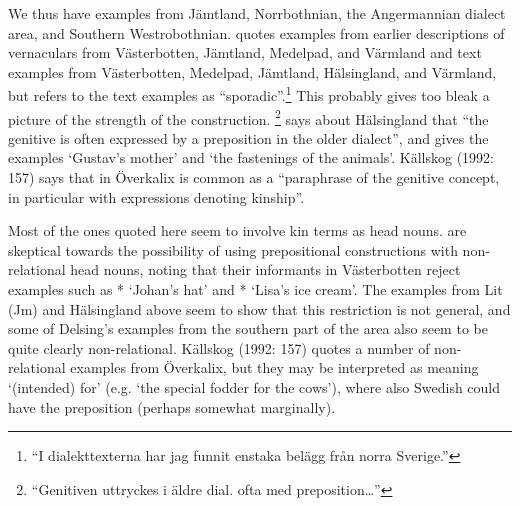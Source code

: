 We thus have examples from Jämtland, Norrbothnian, the Angermannian dialect area, and Southern Westrobothnian. \citet[44]{Delsing2003a} quotes examples from earlier descriptions of vernaculars from Västerbotten, Jämtland, Medelpad, and Värmland and text examples from Västerbotten, Medelpad, Jämtland, Hälsingland, and Värmland, but refers to the text examples as “sporadic”.\footnote{ “I dialekttexterna har jag funnit enstaka belägg från norra Sverige.” } This probably gives too bleak a picture of the strength of the construction. \citet[61]{Hedblom1978}\footnote{ “Genitiven uttryckes i äldre dial. ofta med preposition…” } says about Hälsingland that “the genitive is often expressed by a preposition in the older dialect”, and gives the examples  ‘Gustav’s mother’ and ‘the fastenings of the animals’. Källskog (1992: 157) says that in Överkalix  is common as a “paraphrase of the genitive concept, in particular with expressions denoting kinship”. 


Most of the ones quoted here seem to involve kin terms as head nouns. \citet{BergholmEtAl1999} are skeptical towards the possibility of using prepositional constructions with non-relational head nouns, noting that their informants in Västerbotten reject examples such as * ‘Johan’s hat’ and * ‘Lisa’s ice cream’. The examples from Lit (Jm) and Hälsingland above seem to show that this restriction is not general, and some of Delsing’s examples from the southern part of the area also seem to be quite clearly non-relational. Källskog (1992: 157) quotes a number of non-relational examples from Överkalix, but they may be interpreted as meaning ‘(intended) for’ (e.g.  ‘the special fodder for the cows’), where also Swedish could have the preposition  (perhaps somewhat marginally). 


